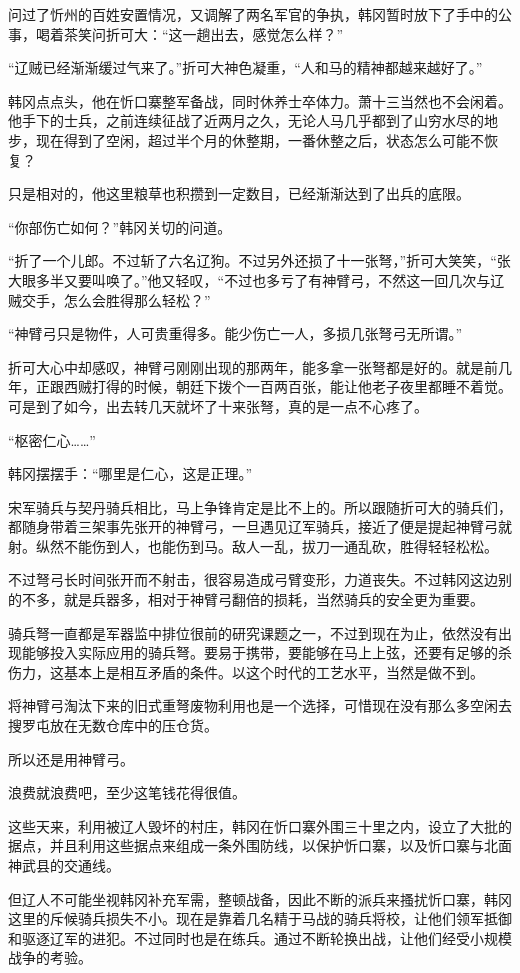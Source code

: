 问过了忻州的百姓安置情况，又调解了两名军官的争执，韩冈暂时放下了手中的公事，喝着茶笑问折可大：“这一趟出去，感觉怎么样？”

“辽贼已经渐渐缓过气来了。”折可大神色凝重，“人和马的精神都越来越好了。”

韩冈点点头，他在忻口寨整军备战，同时休养士卒体力。萧十三当然也不会闲着。他手下的士兵，之前连续征战了近两月之久，无论人马几乎都到了山穷水尽的地步，现在得到了空闲，超过半个月的休整期，一番休整之后，状态怎么可能不恢复？

只是相对的，他这里粮草也积攒到一定数目，已经渐渐达到了出兵的底限。

“你部伤亡如何？”韩冈关切的问道。

“折了一个儿郎。不过斩了六名辽狗。不过另外还损了十一张弩，”折可大笑笑，“张大眼多半又要叫唤了。”他又轻叹，“不过也多亏了有神臂弓，不然这一回几次与辽贼交手，怎么会胜得那么轻松？”

“神臂弓只是物件，人可贵重得多。能少伤亡一人，多损几张弩弓无所谓。”

折可大心中却感叹，神臂弓刚刚出现的那两年，能多拿一张弩都是好的。就是前几年，正跟西贼打得的时候，朝廷下拨个一百两百张，能让他老子夜里都睡不着觉。可是到了如今，出去转几天就坏了十来张弩，真的是一点不心疼了。

“枢密仁心……”

韩冈摆摆手：“哪里是仁心，这是正理。”

宋军骑兵与契丹骑兵相比，马上争锋肯定是比不上的。所以跟随折可大的骑兵们，都随身带着三架事先张开的神臂弓，一旦遇见辽军骑兵，接近了便是提起神臂弓就射。纵然不能伤到人，也能伤到马。敌人一乱，拔刀一通乱砍，胜得轻轻松松。

不过弩弓长时间张开而不射击，很容易造成弓臂变形，力道丧失。不过韩冈这边别的不多，就是兵器多，相对于神臂弓翻倍的损耗，当然骑兵的安全更为重要。

骑兵弩一直都是军器监中排位很前的研究课题之一，不过到现在为止，依然没有出现能够投入实际应用的骑兵弩。要易于携带，要能够在马上上弦，还要有足够的杀伤力，这基本上是相互矛盾的条件。以这个时代的工艺水平，当然是做不到。

将神臂弓淘汰下来的旧式重弩废物利用也是一个选择，可惜现在没有那么多空闲去搜罗屯放在无数仓库中的压仓货。

所以还是用神臂弓。

浪费就浪费吧，至少这笔钱花得很值。

这些天来，利用被辽人毁坏的村庄，韩冈在忻口寨外围三十里之内，设立了大批的据点，并且利用这些据点来组成一条外围防线，以保护忻口寨，以及忻口寨与北面神武县的交通线。

但辽人不可能坐视韩冈补充军需，整顿战备，因此不断的派兵来搔扰忻口寨，韩冈这里的斥候骑兵损失不小。现在是靠着几名精于马战的骑兵将校，让他们领军抵御和驱逐辽军的进犯。不过同时也是在练兵。通过不断轮换出战，让他们经受小规模战争的考验。
